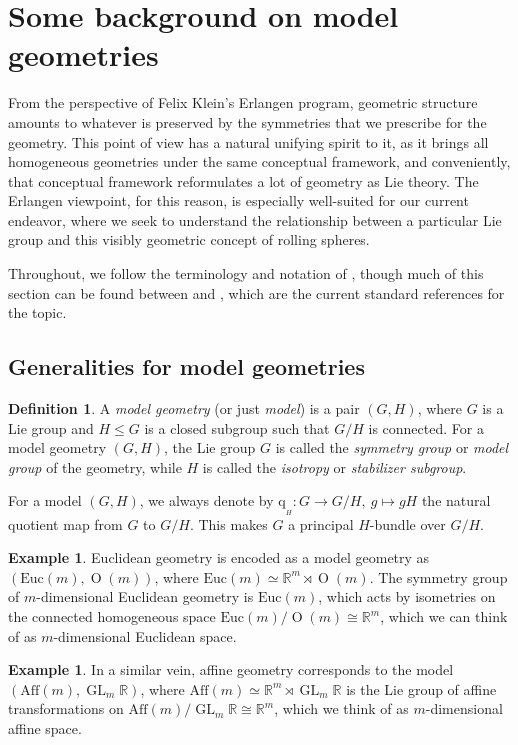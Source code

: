 \documentclass[12pt,a4paper]{amsart}
\theoremstyle{definition}
\newtheorem{definition}[theorem]{Definition}
\newtheorem{example}[theorem]{Example}
\DeclareMathOperator{\Orth}{O}
\DeclareMathOperator{\GLin}{GL}
\newcommand{\quot}[1]{\mathrm{q}_{{}_{#1}}}
\begin{document}
\section{Some background on model geometries}\label{background}
From the perspective of Felix Klein's Erlangen program, geometric structure amounts to whatever is preserved by the symmetries that we prescribe for the geometry. This point of view has a natural unifying spirit to it, as it brings all homogeneous geometries under the same conceptual framework, and conveniently, that conceptual framework reformulates a lot of geometry as Lie theory. The Erlangen viewpoint, for this reason, is especially well-suited for our current endeavor, where we seek to understand the relationship between a particular Lie group and this visibly geometric concept of rolling spheres.

Throughout, we follow the terminology and notation of \cite{EricksonThesis}, though much of this section can be found between \cite{Sharpe1997} and \cite{CapSlovakPG1}, which are the current standard references for the topic.

\subsection{Generalities for model geometries}
\begin{definition}A \emph{model geometry} (or just \emph{model}) is a pair $(G,H)$, where $G$ is a Lie group and $H\leq G$ is a closed subgroup such that $G/H$ is connected. For a model geometry $(G,H)$, the Lie group $G$ is called the \emph{symmetry group} or \emph{model group} of the geometry, while $H$ is called the \emph{isotropy} or \emph{stabilizer subgroup}.\end{definition}

For a model $(G,H)$, we always denote by $\quot{H}\!:G\to G/H,~ g\mapsto gH$ the natural quotient map from $G$ to $G/H$. This makes $G$ a principal $H$-bundle over $G/H$.

\begin{example}Euclidean geometry is encoded as a model geometry as $(\mathrm{Euc}(m),\Orth(m))$, where $\mathrm{Euc}(m)\simeq\mathbb{R}^m\rtimes\Orth(m)$. The symmetry group of $m$-dimensional Euclidean geometry is $\mathrm{Euc}(m)$, which acts by isometries on the connected homogeneous space $\mathrm{Euc}(m)/\Orth(m)\cong\mathbb{R}^m$, which we can think of as $m$-dimensional Euclidean space.\end{example}

\begin{example}In a similar vein, affine geometry corresponds to the model $(\mathrm{Aff}(m),\GLin_m\mathbb{R})$, where $\mathrm{Aff}(m)\simeq\mathbb{R}^m\rtimes\GLin_m\mathbb{R}$ is the Lie group of affine transformations on $\mathrm{Aff}(m)/\GLin_m\mathbb{R}\cong\mathbb{R}^m$, which we think of as $m$-dimensional affine space.\end{example}
\end{document}
